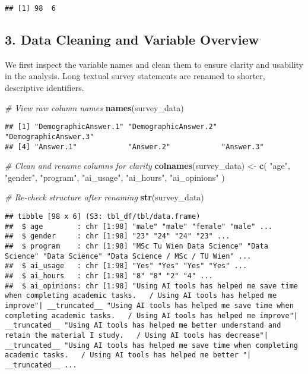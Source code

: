 \documentclass[
]{article}
\newenvironment{Shaded}{\begin{snugshade}}{\end{snugshade}}
\newcommand{\CommentTok}[1]{\textcolor[rgb]{0.56,0.35,0.01}{\textit{#1}}}
\newcommand{\FunctionTok}[1]{\textcolor[rgb]{0.13,0.29,0.53}{\textbf{#1}}}
\newcommand{\NormalTok}[1]{#1}
\newcommand{\OtherTok}[1]{\textcolor[rgb]{0.56,0.35,0.01}{#1}}
\newcommand{\StringTok}[1]{\textcolor[rgb]{0.31,0.60,0.02}{#1}}
\begin{document}
\begin{verbatim}
## [1] 98  6
\end{verbatim}

\subsection{3. Data Cleaning and Variable
Overview}\label{data-cleaning-and-variable-overview}

We first inspect the variable names and clean them to ensure clarity and
usability in the analysis. Long textual survey statements are renamed to
shorter, descriptive identifiers.

\begin{Shaded}
\begin{Highlighting}[]
\CommentTok{\# View raw column names}
\FunctionTok{names}\NormalTok{(survey\_data)}
\end{Highlighting}
\end{Shaded}

\begin{verbatim}
## [1] "DemographicAnswer.1" "DemographicAnswer.2" "DemographicAnswer.3"
## [4] "Answer.1"            "Answer.2"            "Answer.3"
\end{verbatim}

\begin{Shaded}
\begin{Highlighting}[]
\CommentTok{\# Clean and rename columns for clarity}
\FunctionTok{colnames}\NormalTok{(survey\_data) }\OtherTok{\textless{}{-}} \FunctionTok{c}\NormalTok{(}
  \StringTok{"age"}\NormalTok{,}
  \StringTok{"gender"}\NormalTok{,}
  \StringTok{"program"}\NormalTok{,}
  \StringTok{"ai\_usage"}\NormalTok{,}
  \StringTok{"ai\_hours"}\NormalTok{,}
  \StringTok{"ai\_opinions"}
\NormalTok{)}

\CommentTok{\# Re{-}check structure after renaming}
\FunctionTok{str}\NormalTok{(survey\_data)}
\end{Highlighting}
\end{Shaded}

\begin{verbatim}
## tibble [98 x 6] (S3: tbl_df/tbl/data.frame)
##  $ age        : chr [1:98] "male" "male" "female" "male" ...
##  $ gender     : chr [1:98] "23" "24" "24" "23" ...
##  $ program    : chr [1:98] "MSc Tu Wien Data Science" "Data Science" "Data Science" "Data Science / MSc / TU Wien" ...
##  $ ai_usage   : chr [1:98] "Yes" "Yes" "Yes" "Yes" ...
##  $ ai_hours   : chr [1:98] "8" "8" "2" "4" ...
##  $ ai_opinions: chr [1:98] "Using AI tools has helped me save time when completing academic tasks.   / Using AI tools has helped me improve"| __truncated__ "Using AI tools has helped me save time when completing academic tasks.   / Using AI tools has helped me improve"| __truncated__ "Using AI tools has helped me better understand and retain the material I study.   / Using AI tools has decrease"| __truncated__ "Using AI tools has helped me save time when completing academic tasks.   / Using AI tools has helped me better "| __truncated__ ...
\end{verbatim}
\end{document}
